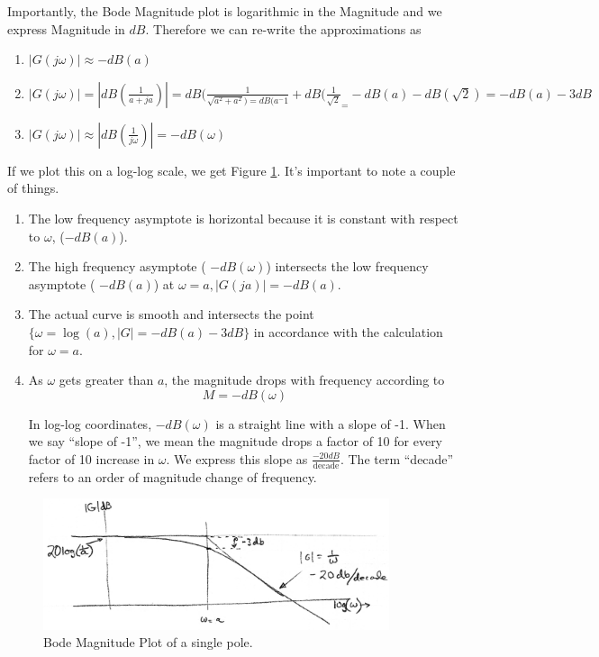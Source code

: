 Importantly, the Bode Magnitude plot is logarithmic in the Magnitude and we express Magnitude in $dB$.
Therefore we can re-write the  approximations  as

\begin{enumerate}
  \item  $|G(j\omega)| \approx -dB(a)$
  \item  $|G(j\omega)| = \left | dB(\frac{1}{a+ja})    \right | = dB(\frac{1}{\sqrt{a^2+a^2}) =
    dB(a^-1}+dB(\frac{1}{\sqrt{2}}_ = -dB(a) - dB(\sqrt{2}) = -dB(a) -3dB$
  \item  $|G(j\omega)| \approx \left | dB(\frac{1}{j\omega}) \right | = -dB(\omega)$
\end{enumerate}

If we plot this on a log-log scale, we get Figure \ref{BodeMagOnePole}.
It's important to note a couple of things.

\begin{enumerate}
  \item The low frequency asymptote is horizontal because it is constant with respect to $\omega$, ($-dB(a)$).
  \item The high frequency asymptote ( $-dB(\omega)$) intersects
         the low frequency asymptote ( $-dB(a)$) at $\omega = a, |G(ja)| = -dB(a)$.
  \item The actual curve is smooth and intersects the point
  $\{\omega=\log(a), |G| = -dB(a)-3dB\}$ in accordance with
  the calculation for  $\omega = a$.

  \item As $\omega$ gets greater than $a$, the magnitude drops with frequency according to
  $$ M = -dB(\omega) $$

In log-log coordinates, $-dB(\omega)$ is a straight line with a slope of -1.  When we say ``slope of -1'', we mean the magnitude drops a factor of 10 for every factor of 10 increase in $\omega$.   We express this slope as $\frac{-20dB}{\mathrm{decade}}$. The term ``decade'' refers to an order of magnitude change of frequency.

\end{enumerate}


\begin{figure}\centering
\includegraphics[width=4.0in]{figs05/00734a.png}
\caption{Bode Magnitude Plot of a single pole.}\label{BodeMagOnePole}
\end{figure}


